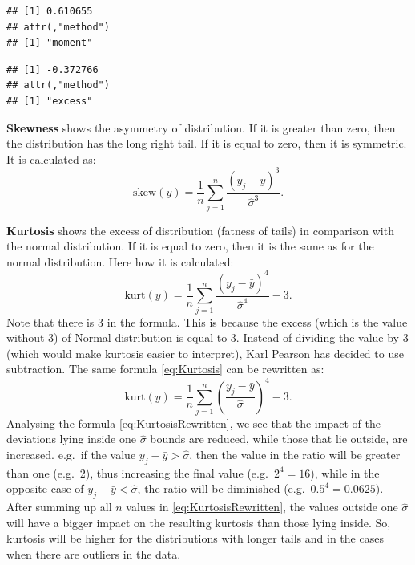 \documentclass[
]{book}
\newenvironment{Shaded}{\begin{snugshade}}{\end{snugshade}}
\newcommand{\FunctionTok}[1]{\textcolor[rgb]{0.00,0.00,0.00}{#1}}
\newcommand{\NormalTok}[1]{#1}
\newcommand{\SpecialCharTok}[1]{\textcolor[rgb]{0.00,0.00,0.00}{#1}}
\theoremstyle{definition}
\theoremstyle{definition}
\theoremstyle{definition}
\theoremstyle{definition}
\theoremstyle{remark}
\begin{document}
\begin{verbatim}
## [1] 0.610655
## attr(,"method")
## [1] "moment"
\end{verbatim}

\begin{Shaded}
\end{Shaded}

\begin{verbatim}
## [1] -0.372766
## attr(,"method")
## [1] "excess"
\end{verbatim}

\textbf{Skewness} shows the asymmetry of distribution. If it is greater than zero, then the distribution has the long right tail. If it is equal to zero, then it is symmetric. It is calculated as:
\begin{equation}
    \mathrm{skew}(y)= \frac{1}{n}\sum_{j=1}^n \frac{(y_j - \bar{y})^3}{\hat{\sigma}^3} .
    \label{eq:Skewness}
\end{equation}

\textbf{Kurtosis} shows the excess of distribution (fatness of tails) in comparison with the normal distribution. If it is equal to zero, then it is the same as for the normal distribution. Here how it is calculated:
\begin{equation}
    \mathrm{kurt}(y)= \frac{1}{n}\sum_{j=1}^n \frac{(y_j - \bar{y})^4}{\hat{\sigma}^4} - 3 .
    \label{eq:Kurtosis}
\end{equation}
Note that there is \(3\) in the formula. This is because the excess (which is the value without 3) of Normal distribution is equal to 3. Instead of dividing the value by 3 (which would make kurtosis easier to interpret), Karl Pearson has decided to use subtraction. The same formula \eqref{eq:Kurtosis} can be rewritten as:
\begin{equation}
    \mathrm{kurt}(y)= \frac{1}{n}\sum_{j=1}^n \left(\frac{y_j - \bar{y}}{\hat{\sigma}}\right)^4 - 3 .
    \label{eq:KurtosisRewritten}
\end{equation}
Analysing the formula \eqref{eq:KurtosisRewritten}, we see that the impact of the deviations lying inside one \(\hat{\sigma}\) bounds are reduced, while those that lie outside, are increased. e.g.~if the value \(y_j - \bar{y} > \hat{\sigma}\), then the value in the ratio will be greater than one (e.g.~2), thus increasing the final value (e.g.~\(2^4=16\)), while in the opposite case of \(y_j - \bar{y} < \hat{\sigma}\), the ratio will be diminished (e.g.~\(0.5^4 = 0.0625\)). After summing up all \(n\) values in \eqref{eq:KurtosisRewritten}, the values outside one \(\hat{\sigma}\) will have a bigger impact on the resulting kurtosis than those lying inside. So, kurtosis will be higher for the distributions with longer tails and in the cases when there are outliers in the data.
\end{document}
